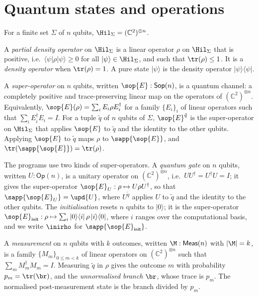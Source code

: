 \section{Quantum states and operations}

For a finite set $\Sigma$ of $n$ qubits, $\Hil_\Sigma = (\mathbb{C}^2)^{\otimes n}$.

\begin{definition}\label{def:density}
A \emph{partial density operator} on $\Hil_\Sigma$ is a linear operator $\rho$
on $\Hil_\Sigma$ that is positive, i.e.\ $\langle\psi|\rho|\psi\rangle \ge 0$
for all $|\psi\rangle \in \Hil_\Sigma$, and such that $\tr(\rho) \le 1$. It is a
\emph{density operator} when $\tr(\rho) = 1$. A pure state $|\psi\rangle$ is the
density operator $|\psi\rangle\langle\psi|$.
\end{definition}

\begin{definition}\label{def:sop}
A \emph{super-operator} on $n$ qubits, written $\sop{E} : \mathsf{Sop}(n)$, is
a quantum channel: a completely positive and trace-preserving linear map on
the operators of $(\mathbb{C}^2)^{\otimes n}$. Equivalently,
$\sop{E}(\rho) = \sum_i E_i \rho E_i^\dagger$ for a family $\{E_i\}_i$ of
linear operators such that $\sum_i E_i^\dagger E_i = I$. For a tuple
$\tilde q$ of $n$ qubits of $\Sigma$, $\sop{E}^{\tilde q}$ is the super-operator
on $\Hil_\Sigma$ that applies $\sop{E}$ to $\tilde q$ and the identity to the
other qubits. Applying $\sop{E}$ to $\tilde q$ maps $\rho$ to $\sapp{\sop{E}}$,
and $\tr(\sapp{\sop{E}}) = \tr(\rho)$.
\end{definition}

The programs use two kinds of super-operators. A \emph{quantum gate} on $n$
qubits, written $U : \mathsf{Op}(n)$, is a unitary operator on
$(\mathbb{C}^2)^{\otimes n}$, i.e.\ $UU^\dagger = U^\dagger U = I$; it gives
the super-operator $\sop{E}_U : \rho \mapsto U \rho U^\dagger$, so that
$\sapp{\sop{E}_U} = \upd{U}$, where $U^{\tilde q}$ applies $U$ to $\tilde q$
and the identity to the other qubits. The \emph{initialisation} resets $n$
qubits to $|0\rangle$; it is the super-operator
$\sop{E}_{\mathsf{init}} : \rho \mapsto \sum_{i} |0\rangle\langle i| \,\rho\,
|i\rangle\langle 0|$, where $i$ ranges over the computational basis, and we
write $\inirho$ for $\sapp{\sop{E}_{\mathsf{init}}}$.

\begin{definition}[Measurement]\label{def:meas}
A \emph{measurement} on $n$ qubits with $k$ outcomes, written
$\M : \mathsf{Meas}(n)$ with $|\M| = k$, is a family $\{M_m\}_{0 \le m < k}$ of
linear operators on $(\mathbb{C}^2)^{\otimes n}$ such that
$\sum_{m} M_m^\dagger M_m = I$. Measuring $\tilde q$ in $\rho$ gives the outcome
$m$ with probability $p_m = \tr(\br)$, and the \emph{unnormalised branch}
$\br$, whose trace is $p_m$. The normalised post-measurement state is the branch
divided by $p_m$.
\end{definition}
